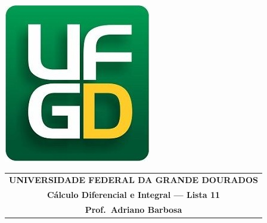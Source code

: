 \documentclass[a4paper,5pt]{amsbook}
\begin{document}
\thispagestyle{empty}
\pagestyle{empty}
\begin{minipage}[h]{0.14\textwidth}
	\includegraphics[scale=0.24]{../../ufgd.png}
\end{minipage}
\begin{minipage}[h]{\textwidth}
\begin{tabular}{c}
{{\bf UNIVERSIDADE FEDERAL DA GRANDE DOURADOS}}\\
{{\bf C\'alculo Diferencial e Integral --- Lista 11}}\\
{{\bf Prof.\ Adriano Barbosa}}\\
\end{tabular}
\vspace{-0.45cm}
%
\end{minipage}

\end{document}
